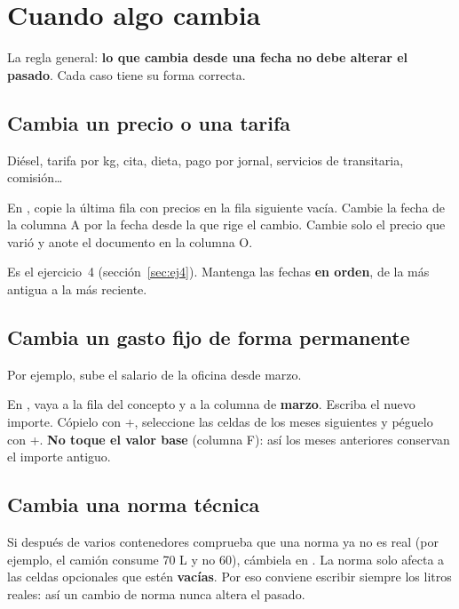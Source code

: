 \chapter{Cuando algo cambia}\label{cap:cambios}

La regla general: \textbf{lo que cambia desde una fecha no debe alterar el pasado}. Cada caso tiene su forma correcta.

\section{Cambia un precio o una tarifa}
Diésel, tarifa por kg, cita, dieta, pago por jornal, servicios de transitaria, comisión\dots
\begin{pasos}
\paso En , copie la última fila con precios en la fila siguiente vacía.
\paso Cambie la fecha de la columna A por la fecha desde la que rige el cambio.
\paso Cambie solo el precio que varió y anote el documento en la columna O.
\end{pasos}
Es el ejercicio~4 (sección~\ref{sec:ej4}). Mantenga las fechas \textbf{en orden}, de la más antigua a la más reciente.

\section{Cambia un gasto fijo de forma permanente}
Por ejemplo, sube el salario de la oficina desde marzo.
\begin{pasos}
\paso En , vaya a la fila del concepto y a la columna de \textbf{marzo}.
\paso Escriba el nuevo importe. Cópielo con +, seleccione las celdas de los meses siguientes y péguelo con +.
\paso \textbf{No toque el valor base} (columna F): así los meses anteriores conservan el importe antiguo.
\end{pasos}

\section{Cambia una norma técnica}
Si después de varios contenedores comprueba que una norma ya no es real (por ejemplo, el camión consume 70 L y no 60), cámbiela en .
La norma solo afecta a las celdas opcionales que estén \textbf{vacías}. Por eso conviene escribir siempre los litros reales: así un cambio de norma
nunca altera el pasado.

